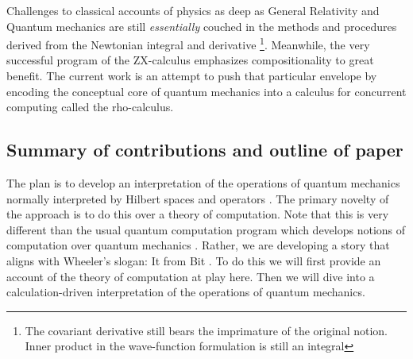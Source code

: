Challenges to classical accounts of physics as deep as General
Relativity \cite{Gravitation} and Quantum mechanics \cite{Dirac1930}
are still \emph{essentially} couched in the methods and procedures
derived from the Newtonian integral and derivative \footnote{The
  covariant derivative still bears the imprimature of the original
  notion. Inner product in the wave-function formulation is still an
  integral}. Meanwhile, the very successful program of the ZX-calculus
emphasizes compositionality to great benefit. The current work is an
attempt to push that particular envelope by encoding the conceptual
core of quantum mechanics into a calculus for concurrent computing
called the rho-calculus.



\subsection{Summary of contributions and outline of paper}

The plan is to develop an interpretation of the operations of quantum
mechanics normally interpreted by Hilbert spaces and operators
\cite{MathematicalFoundationsQM}. The primary novelty of the approach
is to do this over a theory of computation. Note that this is very
different than the usual quantum computation program which develops
notions of computation over quantum mechanics \cite{544199}. Rather,
we are developing a story that aligns with Wheeler's slogan: It from
Bit \cite{HowComeTime}. To do this we will first provide an account of
the theory of computation at play here. Then we will dive into a
calculation-driven interpretation of the operations of quantum
mechanics.

